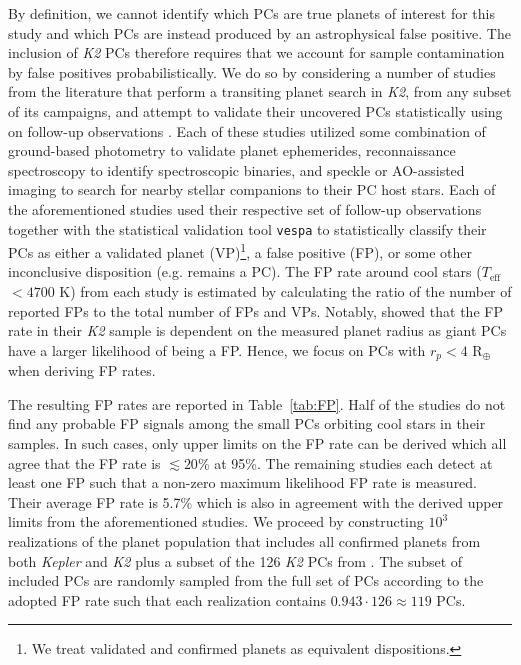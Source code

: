 \documentclass[twocolumn]{emulateapj}
\newcommand{\kepler}[1]{\emph{Kepler}#1}
\newcommand{\ktwo}[1]{\emph{K2}#1}
\newcommand{\teff}[1]{$T_{\text{eff}}$#1}
\begin{document}
By definition, we cannot identify which PCs are true planets of interest for this study and
which PCs are instead produced by an astrophysical false positive. 
The inclusion of \ktwo{} PCs therefore requires that we account for sample contamination by false positives
probabilistically. We do so by considering
a number of studies from the literature that perform a transiting planet search in \ktwo{,} from any subset of its campaigns,
and attempt to validate their uncovered PCs statistically using on follow-up observations
\citep{montet15,crossfield16b,dressing17,hirano18,livingston18a,mayo18}. Each of these studies utilized some combination of
ground-based photometry to validate planet ephemerides, reconnaissance
spectroscopy to identify spectroscopic binaries, and speckle or AO-assisted imaging to search for nearby stellar companions to
their PC host stars. Each of the aforementioned studies used their respective set of follow-up observations together with the
statistical validation tool \texttt{vespa} \citep{morton12,morton15} to statistically classify their PCs as either a validated
planet (VP)\footnote{We treat validated and confirmed planets as equivalent dispositions.},
a false positive (FP), or some other inconclusive disposition (e.g. remains a PC). The FP rate around cool
stars (\teff{} $< 4700$ K) from each study is estimated by calculating the ratio of the number of reported FPs to
the total number of FPs and VPs. Notably, \cite{crossfield16b} showed that the FP rate in their \ktwo{} sample is dependent
on the measured planet radius as giant PCs have a larger likelihood of
being a FP. Hence, we focus on PCs with $r_p<4$ R$_{\oplus}$ when deriving FP rates.

The resulting FP rates are reported in Table~\ref{tab:FP}. Half of the studies do not find any probable
FP signals among the small PCs orbiting cool stars in their samples. In such cases, only upper limits on the FP rate
can be derived which all agree that the FP rate is $\lesssim 20$\% at 95\%. The remaining studies
each detect at least one FP such that a non-zero maximum likelihood FP rate is measured. Their average FP rate is 5.7\%
which is also in agreement with the derived upper limits from the aforementioned studies.
We proceed by constructing $10^3$ realizations of the planet population
that includes all confirmed planets from both \kepler{} and \ktwo{} plus a subset of the 126 \ktwo{} PCs from
\cite{kruse19}. The subset of included PCs are randomly sampled from the full set of PCs
according to the adopted FP rate such that each realization contains $0.943\cdot 126 \approx 119$ PCs.
\end{document}
